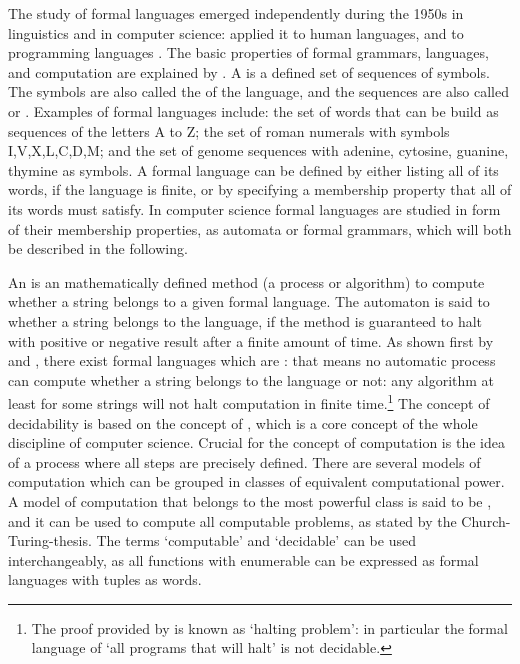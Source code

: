 The study of formal languages emerged independently during the 1950s in
linguistics and in computer science:  applied it to human
languages, and  to programming languages
\cite{Greibach1981}. The basic properties of formal grammars, languages, and
computation are explained by \textcite{Hopcroft1979}.  A 
is a defined set of sequences of symbols. The symbols are also called the
 of the language, and the sequences are also called
 or . Examples of formal languages
include: the set of words that can be build as sequences of the letters A to Z;
the set of roman numerals with symbols I,V,X,L,C,D,M; and the set of
genome sequences with adenine, cytosine, guanine, thymine as symbols.  A
formal language can be defined by either listing all of its words, if the
language is finite, or by specifying a membership property that all of its
words must satisfy. In computer science formal languages are studied in form of
their membership properties, as automata or formal grammars, which will both be
described in the following.

An  is an mathematically defined method (a process or
algorithm) to compute whether a string belongs to a given formal language. The
automaton is said to  whether a string belongs to
the language, if the method is guaranteed to halt with positive or negative
result after a finite amount of time. As shown first by \textcite{Turing1936}
and \textcite{Church1936}, there exist formal languages which are
: that means no automatic process can compute
whether a string belongs to the language or not: any algorithm at least for
some strings will not halt computation in finite time.\footnote{The proof
provided by \textcite{Turing1936} is known as `halting problem': in particular
the formal language of `all programs that will halt' is not decidable.} The
concept of decidability is based on the concept of , which is
a core concept of the whole discipline of computer science. Crucial for the
concept of computation is the idea of a process where all steps are precisely
defined. There are several models of computation which can be grouped in
classes of equivalent computational power. A model of computation that belongs
to the most powerful class is said to be , and it can be
used to compute all computable problems, as stated by the Church-Turing-thesis.
The terms `computable' and `decidable' can be used interchangeably, as all
functions with enumerable  can be expressed as formal languages
with tuples as words.

